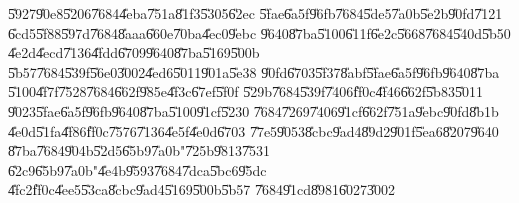 \documentclass[12pt,a4paper]{article}
\begin{document}
\bigskip

\U{5927}\U{90e8}\U{5206}\U{7684}\U{4eba}\U{751a}\U{81f3}\U{5305}\U{62ec}%
\U{5fae}\U{6a5f}\U{96fb}\U{7684}\U{5de5}\U{7a0b}\U{5e2b}\U{90fd}\U{7121}%
\U{6cd5}\U{5f88}\U{597d}\U{7684}\U{8aaa}\U{660e}\U{70ba}\U{4ec0}\U{9ebc}%
\U{9640}\U{87ba}\U{5100}\U{611f}\U{6e2c}\U{5668}\U{7684}\U{540d}\U{5b50}%
\U{4e2d}\U{4ecd}\U{7136}\U{4fdd}\U{6709}\U{9640}\U{87ba}\U{5169}\U{500b}%
\U{5b57}\U{7684}\U{539f}\U{56e0}\U{3002}\U{4ed6}\U{5011}\U{901a}\U{5e38}%
\U{90fd}\U{6703}\U{5f37}\U{8abf}\U{5fae}\U{6a5f}\U{96fb}\U{9640}\U{87ba}%
\U{5100}\U{4f7f}\U{7528}\U{7684}\U{662f}\U{985e}\U{4f3c}\U{67ef}\U{5f0f}%
\U{529b}\U{7684}\U{539f}\U{7406}\U{ff0c}\U{4f46}\U{662f}\U{5b83}\U{5011}%
\U{9023}\U{5fae}\U{6a5f}\U{96fb}\U{9640}\U{87ba}\U{5100}\U{91cf}\U{5230}%
\U{7684}\U{7269}\U{7406}\U{91cf}\U{662f}\U{751a}\U{9ebc}\U{90fd}\U{8b1b}%
\U{4e0d}\U{51fa}\U{4f86}\U{ff0c}\U{7576}\U{7136}\U{4e5f}\U{4e0d}\U{6703}%
\U{77e5}\U{9053}\U{8cbc}\U{9ad4}\U{89d2}\U{901f}\U{5ea6}\U{8207}\U{9640}%
\U{87ba}\U{7684}\U{904b}\U{52d5}\U{65b9}\U{7a0b}"\U{725b}\U{9813}\U{7531}%
\U{62c9}\U{65b9}\U{7a0b}"\U{4e4b}\U{9593}\U{7684}\U{7dca}\U{5bc6}\U{95dc}%
\U{4fc2}\U{ff0c}\U{4ee5}\U{53ca}\U{8cbc}\U{9ad4}\U{5169}\U{500b}\U{5b57}%
\U{7684}\U{91cd}\U{8981}\U{6027}\U{3002}

\bigskip
\end{document}
